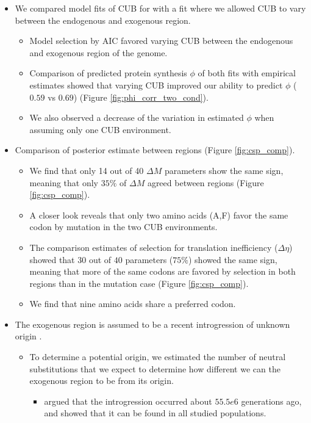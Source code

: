 \documentclass[12pt]{article}
\begin{document}
\begin{itemize}
	\item We compared model fits of CUB for \kluyveri with a fit where we allowed CUB to vary between the endogenous and exogenous region.
	\begin{itemize}
		\item Model selection by AIC favored varying CUB between the endogenous and exogenous region of the \kluyveri genome.
		\item Comparison of predicted protein synthesis $\phi$ of both fits with empirical estimates showed that varying CUB improved our ability to predict $\phi$ ($0.59$ vs $0.69$) (Figure \ref{fig:phi_corr_two_cond}).
		\item We also observed a decrease of the variation in estimated $\phi$ when assuming only one CUB environment.
	\end{itemize}
	\item Comparison of posterior estimate between regions (Figure  \ref{fig:csp_comp}).
	\begin{itemize}
		\item We find that only 14 out of 40 $\Delta M$ parameters show the same sign, meaning that only $35 \%$ of $\Delta M$ agreed between regions (Figure \ref{fig:csp_comp}). 
		\item A closer look reveals that only two amino acids (A,F) favor the same codon by mutation in the two CUB environments.
		\item The comparison estimates of selection for translation inefficiency ($\Delta \eta$) showed that $30$ out of $40$ parameters ($75 \%$) showed the same sign, meaning that more of the same codons are favored by selection in both regions than in the mutation case (Figure \ref{fig:csp_comp}).
		\item We find that nine amino acids share a preferred codon.
	\end{itemize}
	\item The exogenous region is assumed to be a recent introgression of unknown origin \citep{friedrich2015}.
	\begin{itemize}
		\item To determine a potential origin, we estimated the number of neutral substitutions that we expect to determine how different we can the exogenous region to be from its origin.
		\begin{itemize}
			\item \citep{friedrich2015} argued that the introgression occurred about $55.5e6$ generations ago, and showed that it can be found in all studied populations.

\end{itemize}
\end{itemize}
\end{itemize}
\end{document}
